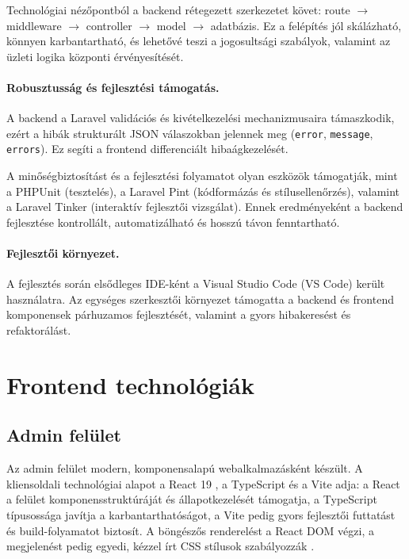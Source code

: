 \documentclass{thesis-ekf}
\begin{document}
Technológiai nézőpontból a backend rétegezett szerkezetet követ: route $\rightarrow$ middleware $\rightarrow$ controller $\rightarrow$ model $\rightarrow$ adatbázis. Ez a felépítés jól skálázható, könnyen karbantartható, és lehetővé teszi a jogosultsági szabályok, valamint az üzleti logika központi érvényesítését.

\paragraph{Robusztusság és fejlesztési támogatás.}
A backend a Laravel validációs és kivételkezelési mechanizmusaira támaszkodik, ezért a hibák strukturált JSON válaszokban jelennek meg (\texttt{error}, \texttt{message}, \texttt{errors}). Ez segíti a frontend differenciált hibaágkezelését.

A minőségbiztosítást és a fejlesztési folyamatot olyan eszközök támogatják, mint a PHPUnit (tesztelés), a Laravel Pint (kódformázás és stílusellenőrzés), valamint a Laravel Tinker (interaktív fejlesztői vizsgálat). Ennek eredményeként a backend fejlesztése kontrollált, automatizálható és hosszú távon fenntartható.

\paragraph{Fejlesztői környezet.}
A fejlesztés során elsődleges IDE-ként a Visual Studio Code (VS Code) került használatra. Az egységes szerkesztői környezet támogatta a backend és frontend komponensek párhuzamos fejlesztését, valamint a gyors hibakeresést és refaktorálást.

\section{Frontend technológiák}

\subsection{Admin felület}
Az admin felület modern, komponensalapú webalkalmazásként készült. A kliensoldali technológiai alapot a React 19 \cite{react,react-19-blog}, a TypeScript \cite{typescript-docs} és a Vite \cite{vite-guide} adja: a React a felület komponensstruktúráját és állapotkezelését támogatja, a TypeScript típusossága javítja a karbantarthatóságot, a Vite pedig gyors fejlesztői futtatást és build-folyamatot biztosít. A böngészős renderelést a React DOM végzi, a megjelenést pedig egyedi, kézzel írt CSS stílusok szabályozzák \cite{css3-roadmap}.
\end{document}
